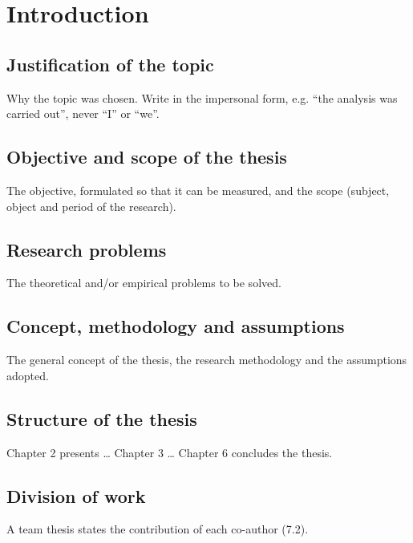\chapter{Introduction}


\section{Justification of the topic}
Why the topic was chosen. Write in the impersonal form, e.g. ``the analysis
was carried out'', never ``I'' or ``we''.

\section{Objective and scope of the thesis}
The objective, formulated so that it can be measured, and the scope
(subject, object and period of the research).

\section{Research problems}
The theoretical and/or empirical problems to be solved.

\section{Concept, methodology and assumptions}
The general concept of the thesis, the research methodology and the
assumptions adopted.

\section{Structure of the thesis}
Chapter 2 presents \ldots{} Chapter 3 \ldots{} Chapter 6 concludes the thesis.

\section{Division of work}
A team thesis states the contribution of each co-author (7.2).
